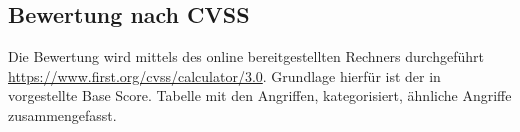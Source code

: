 \subsection{Bewertung nach CVSS}
\label{sec:analysis_cvss}
    Die Bewertung wird mittels des online bereitgestellten Rechners durchgeführt \url{https://www.first.org/cvss/calculator/3.0}.
    Grundlage hierfür ist der in  vorgestellte Base Score.
	Tabelle mit den Angriffen, kategorisiert, ähnliche Angriffe zusammengefasst.